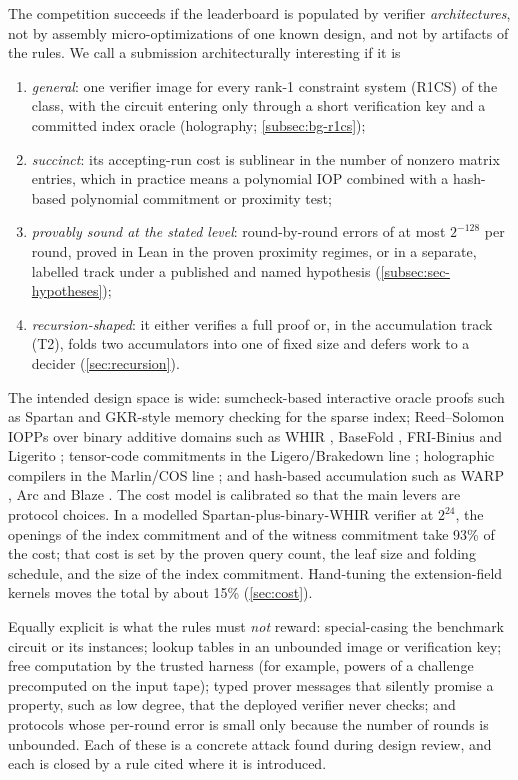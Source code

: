 The competition succeeds if the leaderboard is populated by verifier \emph{architectures}, not by
assembly micro-optimizations of one known design, and not by artifacts of the rules. We call a
submission architecturally interesting if it is
\begin{enumerate}[nosep]
\item \emph{general}: one verifier image for every rank-1 constraint system (R1CS) of the class,
  with the circuit entering only through a short verification key and a committed index oracle
  (holography; \cref{subsec:bg-r1cs});
\item \emph{succinct}: its accepting-run cost is sublinear in the number of nonzero matrix entries,
  which in practice means a polynomial IOP combined with a hash-based polynomial commitment or
  proximity test;
\item \emph{provably sound at the stated level}: round-by-round errors of at most $2^{-128}$ per
  round, proved in Lean in the proven proximity regimes, or in a separate, labelled track under a
  published and named hypothesis (\cref{subsec:sec-hypotheses});
\item \emph{recursion-shaped}: it either verifies a full proof or, in the accumulation track (T2),
  folds two accumulators into one of fixed size and defers work to a decider (\cref{sec:recursion}).
\end{enumerate}
The intended design space is wide: sumcheck-based interactive oracle proofs such as Spartan
\cite{Set20-Spartan} and GKR-style memory checking for the sparse index; Reed--Solomon IOPPs over
binary additive domains such as WHIR \cite{ACFY24-WHIR}, BaseFold \cite{ZCF24-BaseFold},
FRI-Binius \cite{DP24-FRIBinius} and Ligerito \cite{NA25-Ligerito}; tensor-code commitments in the
Ligero/Brakedown line \cite{AHIV17-Ligero,GLSTW23-Brakedown}; holographic compilers in the
Marlin/COS line \cite{CHMMVW20-Marlin,COS20}; and hash-based accumulation such as WARP
\cite{BCFW25-WARP}, Arc \cite{BMNW25-Arc} and Blaze \cite{BCFRRZ25-Blaze}. The cost model is
calibrated so that the main levers are protocol choices. In a modelled Spartan-plus-binary-WHIR
verifier at $2^{24}$, the openings of the index commitment and of the witness commitment take
93\% of the cost; that cost is set by the proven query count, the leaf size and folding schedule,
and the size of the index commitment. Hand-tuning the extension-field kernels moves the total by
about 15\% (\cref{sec:cost}).

Equally explicit is what the rules must \emph{not} reward: special-casing the benchmark circuit or
its instances; lookup tables in an unbounded image or verification key; free computation by the
trusted harness (for example, powers of a challenge precomputed on the input tape); typed prover
messages that silently promise a property, such as low degree, that the deployed verifier never
checks; and protocols whose per-round error is small only because the number of rounds is
unbounded. Each of these is a concrete attack found during design review, and each is closed by a
rule cited where it is introduced.

